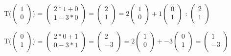 \documentclass[12pt]{article}
\begin{document}
\begin{enumerate}
    T($\begin{pmatrix}
        1\\
        0 \\
    \end{pmatrix}$) = $\begin{pmatrix}
        2 * 1+ 0\\
        1 - 3 * 0 \\
    \end{pmatrix} = \begin{pmatrix}
        2\\
        1\\
    \end{pmatrix} = 2 \begin{pmatrix}
        1\\
        0\\
    \end{pmatrix} + 1\begin{pmatrix}
        0\\
        1\\
    \end{pmatrix}$ : $\begin{pmatrix}
        2\\
        1\\
    \end{pmatrix}$

     T($\begin{pmatrix}
        0\\
        1 \\
    \end{pmatrix}$) = $\begin{pmatrix}
        2 * 0 + 1\\
        0 - 3 * 1 \\
    \end{pmatrix} = \begin{pmatrix}
        2\\
        -3\\
    \end{pmatrix} = 2 \begin{pmatrix}
        1\\
        0\\
    \end{pmatrix} + -3\begin{pmatrix}
        0\\
        1\\
    \end{pmatrix} = \begin{pmatrix}
        1\\
        -3\\
    \end{pmatrix}$


\end{enumerate}
\end{document}
